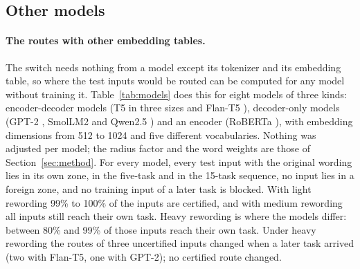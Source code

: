 \subsection{Other models}
\label{sec:models}

\paragraph{The routes with other embedding tables.} The switch needs nothing from a model except its
tokenizer and its embedding table, so where the test inputs would be routed can be computed for any
model without training it. Table~\ref{tab:models} does this for eight models of three kinds:
encoder-decoder models (T5 in three sizes \citep{raffel2020t5} and Flan-T5
\citep{chung2024flant5}), decoder-only models (GPT-2 \citep{radford2019gpt2}, SmolLM2
\citep{allal2025smollm2} and Qwen2.5 \citep{yang2024qwen25}) and an encoder (RoBERTa
\citep{liu2019roberta}), with embedding dimensions from 512 to 1024 and five different
vocabularies. Nothing was adjusted per model; the radius factor and the word weights are those of
Section~\ref{sec:method}. For every model, every test input with the original wording lies in its
own zone, in the five-task and in the 15-task sequence, no input lies in a foreign zone, and no
training input of a later task is blocked. With light rewording 99\% to 100\% of the inputs are
certified, and with medium rewording all inputs still reach their own task. Heavy rewording is
where the models differ: between 80\% and 99\% of those inputs reach their own task. Under heavy rewording the routes of three uncertified inputs changed when a later task arrived (two with Flan-T5, one with GPT-2); no certified route changed.

\begin{table}[t]
  \caption{Routes computed with the embedding tables of eight models (CPU, no training). Entries
  with four numbers are for the original / light / medium / heavy wording. ``Wrong zone'': inputs
  inside the zone of another task, over both sequences and all wordings. ``Changed'': inputs
  whose route changed after their task had been added. With the original wording every input of
  the 15-task sequence is certified for every model.}
  \label{tab:models}
  \centering
  \footnotesize
  \setlength{\tabcolsep}{3pt}
  
\end{table}

